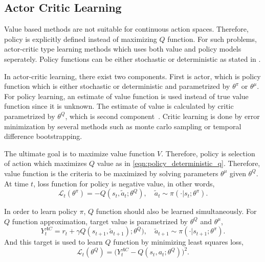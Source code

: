 \subsection{Actor Critic Learning}

Value based methods are not suitable for continuous action spaces. 
Therefore, policy is explicitly defined instead of maximizing $Q$ function. 
For such problems, actor-critic type learning methods which uses both value and policy models seperately. 
Policy functions can be either stochastic or deterministic as stated in .  

In actor-critic learning, there exist two components. 
First is actor, which is policy function which is either stochastic or deterministic and parametrized by $\theta^{\pi}$ or $\theta^{\mu}$. 
For policy learning, an estimate of value function is used instead of true value function since it is unknown. 
The estimate of value is calculated by critic parametrized by $\theta^Q$, which is second component~\cite{silver_deterministic_2014}. 
Critic learning is done by error minimization by several methods such as monte carlo sampling or temporal difference bootstrapping.

The ultimate goal is to maximize value function $V$. Therefore, policy is selection of action which maximizes $Q$ value as in \eqref{eqn:policy_deterministic_q}. 
Therefore, value function is the criteria to be maximized by solving parameters $\theta^\mu$ given $\theta^Q$. At time $t$, loss function for policy is negative value, in other words,  
\begin{equation}
\label{eqn:ac_value_maximization}
\mathcal{L}_t(\theta^\pi) = - Q(s_t, \widetilde{a}_t;\theta^Q), \quad \widetilde{a}_t \sim \pi(\cdot|s_t;\theta^\pi).
\end{equation}

In order to learn policy $\pi$, $Q$ function should also be learned simultaneously. 
For $Q$ function approximation, target value is parametrized by $\theta^Q$ and $\theta^\mu$,
\begin{equation}
\label{eqn:ac_target}
Y_t^{AC} = r_t + \gamma Q(s_{t+1}, \widetilde{a}_{t+1});\theta^Q), \quad \widetilde{a}_{t+1} \sim \pi(\cdot|s_{t+1};\theta^{\pi}).
\end{equation}
And this target is used to learn $Q$ function by minimizing least squares loss,
\begin{equation}
\label{eqn:ac_loss}
\mathcal{L}_t(\theta^Q) = \big( Y_t^{AC} - Q(s_t,a_t;\theta^Q) \big) ^ 2.
\end{equation}

